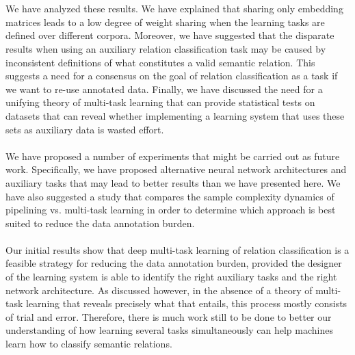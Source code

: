 \\\\
We have analyzed these results. We have explained that sharing only embedding matrices leads to a low degree of weight sharing when the learning tasks are defined over different corpora. Moreover, we have suggested that the disparate results when using an auxiliary relation classification task may be caused by inconsistent definitions of what constitutes a valid semantic relation. This suggests a need for a consensus on the goal of relation classification as a task if we want to re-use annotated data. Finally, we have discussed the need for a unifying theory of multi-task learning that can provide statistical tests on datasets that can reveal whether implementing a learning system that uses these sets as auxiliary data is wasted effort.
\\\\
We have proposed a number of experiments that might be carried out as future work. Specifically, we have proposed alternative neural network architectures and auxiliary tasks that may lead to better results than we have presented here. We have also suggested a study that compares the sample complexity dynamics of pipelining vs. multi-task learning in order to determine which approach is best suited to reduce the data annotation burden.
\\\\
Our initial results show that deep multi-task learning of relation classification is a feasible strategy for reducing the data annotation burden, provided the designer of the learning system is able to identify the right auxiliary tasks and the right network architecture. As discussed however, in the absence of a theory of multi-task learning that reveals precisely what that entails, this process mostly consists of trial and error. Therefore, there is much work still to be done to better our understanding of how learning several tasks simultaneously can help machines learn how to classify semantic relations.